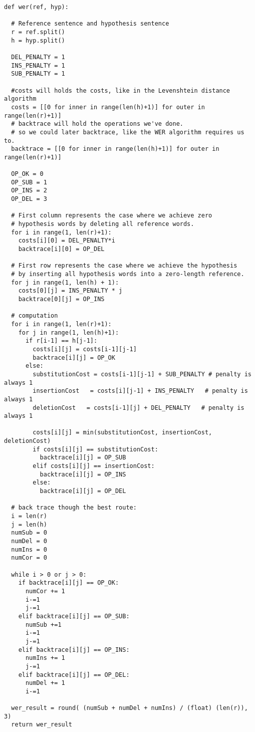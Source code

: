 \begin{verbatim}
def wer(ref, hyp):

  # Reference sentence and hypothesis sentence
  r = ref.split()
  h = hyp.split()

  DEL_PENALTY = 1
  INS_PENALTY = 1
  SUB_PENALTY = 1

  #costs will holds the costs, like in the Levenshtein distance algorithm
  costs = [[0 for inner in range(len(h)+1)] for outer in range(len(r)+1)]
  # backtrace will hold the operations we've done.
  # so we could later backtrace, like the WER algorithm requires us to.
  backtrace = [[0 for inner in range(len(h)+1)] for outer in range(len(r)+1)]

  OP_OK = 0
  OP_SUB = 1
  OP_INS = 2
  OP_DEL = 3
   
  # First column represents the case where we achieve zero
  # hypothesis words by deleting all reference words.
  for i in range(1, len(r)+1):
    costs[i][0] = DEL_PENALTY*i
    backtrace[i][0] = OP_DEL
     
  # First row represents the case where we achieve the hypothesis
  # by inserting all hypothesis words into a zero-length reference.
  for j in range(1, len(h) + 1):
    costs[0][j] = INS_PENALTY * j
    backtrace[0][j] = OP_INS
   
  # computation
  for i in range(1, len(r)+1):
    for j in range(1, len(h)+1):
      if r[i-1] == h[j-1]:
        costs[i][j] = costs[i-1][j-1]
        backtrace[i][j] = OP_OK
      else:
        substitutionCost = costs[i-1][j-1] + SUB_PENALTY # penalty is always 1
        insertionCost   = costs[i][j-1] + INS_PENALTY   # penalty is always 1
        deletionCost   = costs[i-1][j] + DEL_PENALTY   # penalty is always 1
         
        costs[i][j] = min(substitutionCost, insertionCost, deletionCost)
        if costs[i][j] == substitutionCost:
          backtrace[i][j] = OP_SUB
        elif costs[i][j] == insertionCost:
          backtrace[i][j] = OP_INS
        else:
          backtrace[i][j] = OP_DEL
         
  # back trace though the best route:
  i = len(r)
  j = len(h)
  numSub = 0
  numDel = 0
  numIns = 0
  numCor = 0
  
  while i > 0 or j > 0:
    if backtrace[i][j] == OP_OK:
      numCor += 1
      i-=1
      j-=1
    elif backtrace[i][j] == OP_SUB:
      numSub +=1
      i-=1
      j-=1
    elif backtrace[i][j] == OP_INS:
      numIns += 1
      j-=1
    elif backtrace[i][j] == OP_DEL:
      numDel += 1
      i-=1

  wer_result = round( (numSub + numDel + numIns) / (float) (len(r)), 3)
  return wer_result

\end{verbatim}


